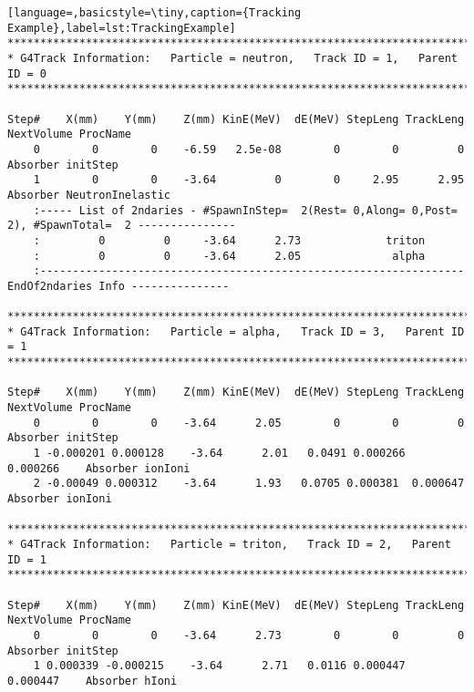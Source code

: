 \begin{lstlisting}[language=,basicstyle=\tiny,caption={Tracking Example},label=lst:TrackingExample]
*********************************************************************************************************
* G4Track Information:   Particle = neutron,   Track ID = 1,   Parent ID = 0
*********************************************************************************************************

Step#    X(mm)    Y(mm)    Z(mm) KinE(MeV)  dE(MeV) StepLeng TrackLeng  NextVolume ProcName
    0        0        0    -6.59   2.5e-08        0        0         0    Absorber initStep
    1        0        0    -3.64         0        0     2.95      2.95    Absorber NeutronInelastic
    :----- List of 2ndaries - #SpawnInStep=  2(Rest= 0,Along= 0,Post= 2), #SpawnTotal=  2 ---------------
    :         0         0     -3.64      2.73             triton
    :         0         0     -3.64      2.05              alpha
    :----------------------------------------------------------------- EndOf2ndaries Info ---------------

*********************************************************************************************************
* G4Track Information:   Particle = alpha,   Track ID = 3,   Parent ID = 1
*********************************************************************************************************

Step#    X(mm)    Y(mm)    Z(mm) KinE(MeV)  dE(MeV) StepLeng TrackLeng  NextVolume ProcName
    0        0        0    -3.64      2.05        0        0         0    Absorber initStep
    1 -0.000201 0.000128    -3.64      2.01   0.0491 0.000266  0.000266    Absorber ionIoni
    2 -0.00049 0.000312    -3.64      1.93   0.0705 0.000381  0.000647    Absorber ionIoni

*********************************************************************************************************
* G4Track Information:   Particle = triton,   Track ID = 2,   Parent ID = 1
*********************************************************************************************************

Step#    X(mm)    Y(mm)    Z(mm) KinE(MeV)  dE(MeV) StepLeng TrackLeng  NextVolume ProcName
    0        0        0    -3.64      2.73        0        0         0    Absorber initStep
    1 0.000339 -0.000215    -3.64      2.71   0.0116 0.000447  0.000447    Absorber hIoni
\end{lstlisting}



